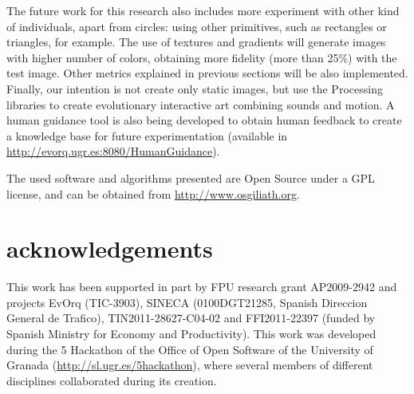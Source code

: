 \documentclass[conference]{IEEEtran}
\begin{document}
The future work for this research also includes more experiment with other kind of individuals, apart from circles: using other primitives, such as rectangles or triangles, for example. The use of textures and gradients will generate images with higher number of colors, obtaining more fidelity (more than 25\%) with the test image. Other metrics explained in previous sections will be also implemented. Finally, our intention is not create only static images, but use the Processing libraries to create evolutionary interactive art combining sounds and motion. A human guidance tool is also being developed to obtain human feedback to create a knowledge base for future experimentation (available in \url{http://evorq.ugr.es:8080/HumanGuidance}).

The used software and algorithms presented are Open Source under a GPL license, and can be obtained from \url{http://www.osgiliath.org}.

\section*{acknowledgements}
This work has been supported in part by FPU research grant AP2009-2942
and projects EvOrq (TIC-3903), SINECA (0100DGT21285, Spanish Direccion
General de Trafico), TIN2011-28627-C04-02 and FFI2011-22397 (funded by
Spanish Ministry for Economy and Productivity). This work was
developed during the 5 Hackathon of the Office of Open Software of the
University of Granada (\url{http://sl.ugr.es/5hackathon}), where
several members of different disciplines collaborated during its
creation. 



\end{document}
